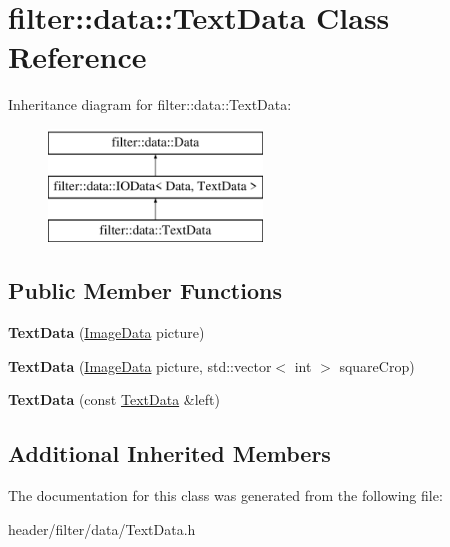 \hypertarget{classfilter_1_1data_1_1_text_data}{}\section{filter\+:\+:data\+:\+:Text\+Data Class Reference}
\label{classfilter_1_1data_1_1_text_data}
Inheritance diagram for filter\+:\+:data\+:\+:Text\+Data\+:\begin{figure}[H]
\begin{center}
\leavevmode
\includegraphics[height=3.000000cm]{df/d79/classfilter_1_1data_1_1_text_data}
\end{center}
\end{figure}
\subsection*{Public Member Functions}
\begin{DoxyCompactItemize}
\item 
\mbox{\label{classfilter_1_1data_1_1_text_data_ad62f81e1603f395f683b616948d23ca4}} 
{\bfseries Text\+Data} (\hyperlink{classfilter_1_1data_1_1_image_data}{Image\+Data} picture)
\item 
\mbox{\label{classfilter_1_1data_1_1_text_data_a612b8f05ece55d1bbabb07bed976a766}} 
{\bfseries Text\+Data} (\hyperlink{classfilter_1_1data_1_1_image_data}{Image\+Data} picture, std\+::vector$<$ int $>$ square\+Crop)
\item 
\mbox{\label{classfilter_1_1data_1_1_text_data_a43cc8a9f9a58e761d1985280160ea585}} 
{\bfseries Text\+Data} (const \hyperlink{classfilter_1_1data_1_1_text_data}{Text\+Data} \&left)
\end{DoxyCompactItemize}
\subsection*{Additional Inherited Members}


The documentation for this class was generated from the following file\+:\begin{DoxyCompactItemize}
\item 
header/filter/data/Text\+Data.\+h\end{DoxyCompactItemize}
